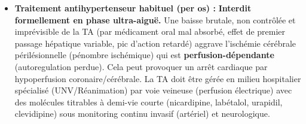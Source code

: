 \documentclass[11pt]{article}
\begin{document}
\begin{exoresolu}
\begin{enumerate}
\begin{itemize}
            \item \textbf{Traitement antihypertenseur habituel (per os) :} \textbf{Interdit formellement en phase ultra-aiguë.} Une baisse brutale, non contrôlée et imprévisible de la TA (par médicament oral mal absorbé, effet de premier passage hépatique variable, pic d'action retardé) aggrave l'ischémie cérébrale périlésionnelle (pénombre ischémique) qui est \textbf{perfusion-dépendante} (autoregulation perdue). Cela peut provoquer un arrêt cardiaque par hypoperfusion coronaire/cérébrale. La TA doit être gérée en milieu hospitalier spécialisé (UNV/Réanimation) par voie veineuse (perfusion électrique) avec des molécules titrables à demi-vie courte (nicardipine, labétalol, urapidil, clevidipine) sous monitoring continu invasif (artériel) et neurologique.
        \end{itemize}
\end{enumerate}
\end{exoresolu}
\end{document}
